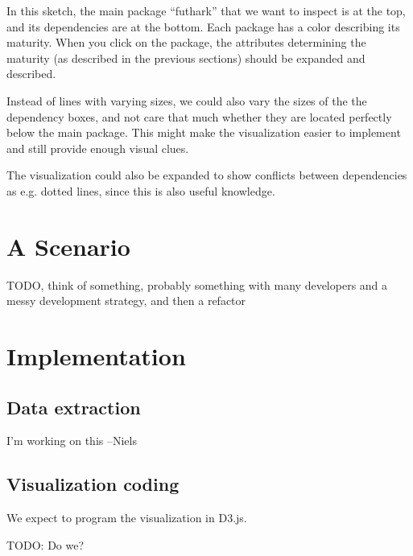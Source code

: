 \documentclass[a4paper,12pt]{article}
\begin{document}
In this sketch, the main package ``futhark'' that we want to inspect is at the
top, and its dependencies are at the bottom.  Each package has a color
describing its maturity.  When you click on the package, the attributes
determining the maturity (as described in the previous sections) should be
expanded and described.

Instead of lines with varying sizes, we could also vary the sizes of the the
dependency boxes, and not care that much whether they are located perfectly
below the main package.  This might make the visualization easier to implement
and still provide enough visual clues.

The visualization could also be expanded to show conflicts between dependencies
as e.g. dotted lines, since this is also useful knowledge.


\section{A Scenario}

TODO, think of something, probably something with many developers and a messy
development strategy, and then a refactor


\section{Implementation}

\subsection{Data extraction}

I'm working on this --Niels

\subsection{Visualization coding}

We expect to program the visualization in D3.js.

TODO: Do we?
\end{document}
